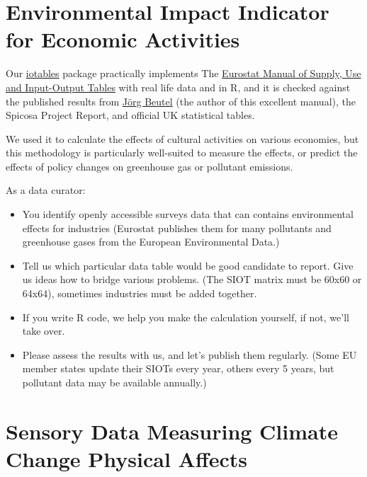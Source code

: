 \documentclass[
  a4paper,
  openany, a4paper, oneside]{book}
\providecommand{\tightlist}{%
  \setlength{\itemsep}{0pt}\setlength{\parskip}{0pt}}
\begin{document}
\hypertarget{environmental-impact-indicator-for-economic-activities}{%
\section{Environmental Impact Indicator for Economic Activities}\label{environmental-impact-indicator-for-economic-activities}}

Our \href{https://iotables.dataobservatory.eu/}{iotables} package practically implements The \href{https://ec.europa.eu/eurostat/en/web/products-manuals-and-guidelines/-/KS-RA-07-013}{Eurostat Manual of Supply, Use and Input-Output Tables} with real life data and in R, and it is checked against the published results from \href{http://ec.europa.eu/eurostat/documents/3859598/5902113/KS-RA-07-013-EN.PDF/b0b3d71e-3930-4442-94be-70b36cea9b39?version=1.0}{Jörg Beutel} (the author of this excellent manual), the Spicosa Project Report, and official UK statistical tables.

We used it to calculate the effects of cultural activities on various economies, but this methodology is particularly well-suited to measure the effects, or predict the effects of policy changes on greenhouse gas or pollutant emissions.

As a data curator:

\begin{itemize}
\tightlist
\item
  You identify openly accessible surveys data that can contains environmental effects for industries (Eurostat publishes them for many pollutants and greenhouse gases from the European Environmental Data.)
\item
  Tell us which particular data table would be good candidate to report. Give us ideas how to bridge various problems. (The SIOT matrix must be 60x60 or 64x64), sometimes industries must be added together.
\item
  If you write R code, we help you make the calculation yourself, if not, we'll take over.\\
\item
  Please assess the results with us, and let's publish them regularly. (Some EU member states update their SIOTs every year, others every 5 years, but pollutant data may be available annually.)
\end{itemize}

\hypertarget{sensory-data-measuring-climate-change-physical-affects}{%
\section{Sensory Data Measuring Climate Change Physical Affects}\label{sensory-data-measuring-climate-change-physical-affects}}
\end{document}
